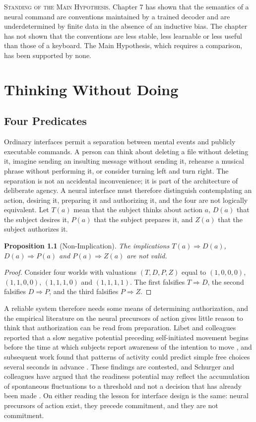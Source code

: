 \documentclass[11pt,twoside,openany]{book}
\newtheorem{proposition}[theorem]{Proposition}
\theoremstyle{definition}
\theoremstyle{remark}
\newenvironment{standing}{\par\medskip\noindent\hrulefill\par\smallskip\noindent\textsc{Standing of the Main Hypothesis.}\enspace}{\par\smallskip\noindent\hrulefill\par\medskip}
\begin{document}
\begin{standing}
Chapter 7 has shown that the semantics of a neural command are conventions maintained by a trained decoder and are underdetermined by finite data in the absence of an inductive bias. The chapter has not shown that the conventions are less stable, less learnable or less useful than those of a keyboard. The Main Hypothesis, which requires a comparison, has been supported by none.
\end{standing}

\chapter{Thinking Without Doing}

\section{Four Predicates}

Ordinary interfaces permit a separation between mental events and publicly executable commands. A person can think about deleting a file without deleting it, imagine sending an insulting message without sending it, rehearse a musical phrase without performing it, or consider turning left and turn right. The separation is not an accidental inconvenience; it is part of the architecture of deliberate agency. A neural interface must therefore distinguish contemplating an action, desiring it, preparing it and authorizing it, and the four are not logically equivalent. Let $T(a)$ mean that the subject thinks about action $a$, $D(a)$ that the subject desires it, $P(a)$ that the subject prepares it, and $Z(a)$ that the subject authorizes it.

\begin{proposition}[Non-Implication]\label{prop:nonimp}
The implications $T(a)\Rightarrow D(a)$, $D(a)\Rightarrow P(a)$ and $P(a)\Rightarrow Z(a)$ are not valid.
\end{proposition}
\begin{proof}
Consider four worlds with valuations $(T,D,P,Z)$ equal to $(1,0,0,0)$, $(1,1,0,0)$, $(1,1,1,0)$ and $(1,1,1,1)$. The first falsifies $T\Rightarrow D$, the second falsifies $D\Rightarrow P$, and the third falsifies $P\Rightarrow Z$.
\end{proof}

A reliable system therefore needs some means of determining authorization, and the empirical literature on the neural precursors of action gives little reason to think that authorization can be read from preparation. Libet and colleagues reported that a slow negative potential preceding self-initiated movement begins before the time at which subjects report awareness of the intention to move \cite{libet1983}, and subsequent work found that patterns of activity could predict simple free choices several seconds in advance \cite{soon2008}. These findings are contested, and Schurger and colleagues have argued that the readiness potential may reflect the accumulation of spontaneous fluctuations to a threshold and not a decision that has already been made \cite{schurger2012}. On either reading the lesson for interface design is the same: neural precursors of action exist, they precede commitment, and they are not commitment.
\end{document}
